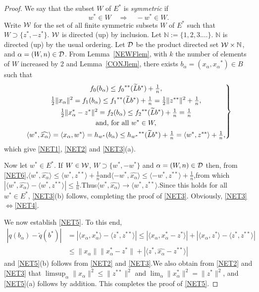 \documentclass[letterpaper]{article}
\theoremstyle{plain}
\theoremstyle{definition}
\numberwithin{equation}{section}
\newcommand{\bra}[2]{\langle#1,#2\rangle}
\newcommand{\D}{{\cal D}}
\newcommand{\dbs}{^{**}}
\newcommand{\half}{{\textstyle\frac{1}{2}}}
\newcommand{\limn}{\lim\nolimits}
\newcommand{\limsupn}{\limsup\nolimits}
\newcommand{\Lt}{{\wt L}}
\newcommand{\NN}{\mathbb N}
\newcommand{\nth}{{\textstyle\frac{1}{n}}}
\newcommand{\qlr}{\quad\Longrightarrow\quad}
\newcommand{\qt}{\wt q}
\newcommand{\wh}{\widehat}
\newcommand{\wt}{\widetilde}
\newcommand{\W}{{\cal W}}
\newcommand{\Lem}{Lemma~\ref}
\newcommand{\Sec}{Section~\ref}
\begin{document}
\begin{proof}
We say that the subset $W$ of $E^*$ is {\em symmetric} if
%
$$w^* \in W \qlr -w^* \in W.$$
%
Write $\W$ for the set of all finite symmetric subsets $W$ of $E^*$ such that $W \supset \{z^*,-z^*\}$.   $\W$ is directed (up) by inclusion.   Let $\NN := \{1,2,3.\dots\}$.   $\NN$ is directed (up) by the usual ordering.  Let $\D$ be the product directed set $\W \times \NN$,  and $\alpha = (W,n) \in \D$.  From \Lem{NEWFlem}, with $k$ the number of elements of $W$ increased by 2 and \Lem{CONJlem}, there exists $b_\alpha = (x_\alpha,{x_\alpha}^*) \in B$ such that
\begin{equation}\label{NET6}
\left.
\begin{gathered}
f_0(b_\alpha) \le {f_0}\dbs(\Lt b^*) + \nth,\\
\half\|x_\alpha\|^2 = f_1(b_\alpha) \le {f_1}\dbs(\Lt b^*) + \nth = \half\|z\dbs\|^2 + \nth,\\
\half\|x_\alpha^* - z^*\|^2 = f_2(b_\alpha)  \le {f_2}\dbs(\Lt b^*) + \nth = \nth\\
\hbox{and, for all }w^* \in W,\\
\bra{w^*}{\wh{x_\alpha}} = \bra{x_\alpha}{w^*} = h_{w^*}(b_\alpha) \le {h_{w^*}}\dbs(\Lt b^*)  + \nth = \bra{w^*}{z\dbs}  + \nth,
\end{gathered}
\right\} 
\end{equation}
%
which give \eqref{NET1}, \eqref{NET2} and \eqref{NET3}(a).
\par
Now let $w^* \in E^*$.   If $W \in \W$, $W \supset \{w^*,-w^*\}$ and $\alpha = (W,n) \in \D$ then, from \eqref{NET6},\quad  $\bra{w^*}{\wh{x_\alpha}} \le \bra{w^*}{z\dbs} + \nth$\quad and\quad $\bra{-w^*}{\wh{x_\alpha}} \le \bra{-w^*}{z\dbs} + \nth$,\quad from which\quad  $|\bra{w^*}{\wh{x_\alpha}} - \bra{w^*}{z\dbs}| \le \nth$.\quad   Thus\quad $\bra{w^*}{\wh{x_\alpha}} \to \bra{w^*}{z\dbs}$.\quad Since this holds for all $w^* \in E^*$, \eqref{NET3}(b) follows, completing the proof of \eqref{NET3}. Obviously, \eqref{NET3}$\iff$\eqref{NET4}. 
\par
We now establish \eqref{NET5}.   To this end,
\begin{align*}
|q(b_\alpha) - \qt(b^*)| &= |\bra{x_\alpha}{x_\alpha^*} - \bra{z^*}{z\dbs}| \le |\bra{x_\alpha}{x_\alpha^* - z^*}| + |\bra{x_\alpha}{z^*} - \bra{z^*}{z\dbs}|\\
&\le \|x_\alpha\|\|x_\alpha^* - z^*\| + |\bra{z^*}{\wh{x_\alpha} - z\dbs}|
\end{align*}
%
and \eqref{NET5}(b) follows from \eqref{NET2} and \eqref{NET3}.\quad We also obtain from \eqref{NET2} and \eqref{NET3} that $\limsupn_\alpha \|x_\alpha\|^2 \le \|z\dbs\|^2$ and $\limn_\alpha  \|x_\alpha^*\|^2 = \|z^*\|^2$, and \eqref{NET5}(a) follows by addition.   This completes the proof of \eqref{NET5}.    
\end{proof}
\end{document}
